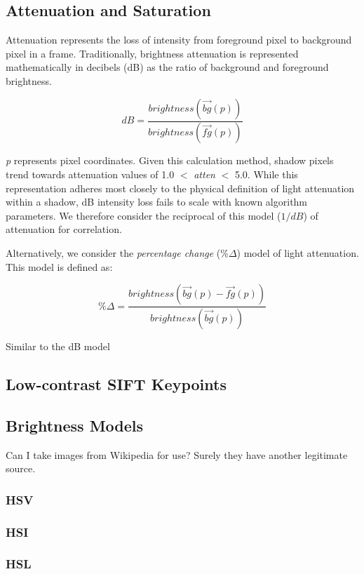 \documentclass[12pt]{report}
\begin{document}
\subsection{Attenuation and Saturation}

Attenuation represents the loss of intensity from foreground pixel to background pixel in a frame. Traditionally, brightness attenuation is represented mathematically in decibels (dB) as the ratio of background and foreground brightness.

\begin{equation}
dB = \dfrac{brightness(\vec{bg}(p))}{brightness(\vec{fg}(p))}
\end{equation}

\textit{p} represents pixel coordinates. Given this calculation method, shadow pixels trend towards attenuation values of 1.0 $<$ \textit{atten} $<$ 5.0. While this representation adheres most closely to the physical definition of light attenuation within a shadow, dB intensity loss fails to scale with known algorithm parameters. We therefore consider the reciprocal of this model ($1/dB$) of attenuation for correlation.

Alternatively, we consider the \textit{percentage change} (\%$\Delta$) model of light attenuation. This model is defined as:

 \begin{equation}
\%\Delta = \dfrac{brightness(\vec{bg}(p) - \vec{fg}(p))}{brightness(\vec{bg}(p))}
\end{equation}

Similar to the dB model

\subsection{Low-contrast SIFT Keypoints}
\subsection{Brightness Models}

Can I take images from Wikipedia for use? Surely they have another legitimate source.

\subsubsection{HSV}
\subsubsection{HSI}
\subsubsection{HSL}
\end{document}
